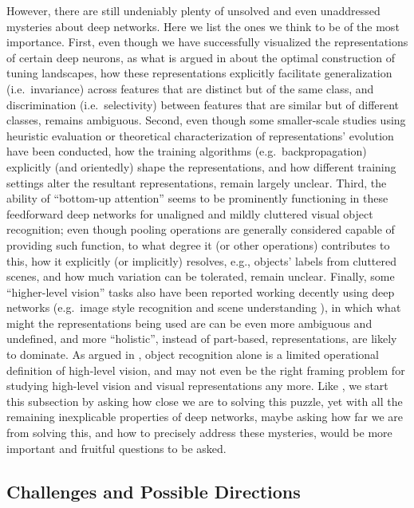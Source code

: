 However, there are still undeniably plenty of unsolved and even unaddressed mysteries about deep networks. Here we list the ones we think to be of the most importance. First, even though we have successfully visualized the representations of certain deep neurons, as what is argued in  about the optimal construction of tuning landscapes, how these representations explicitly facilitate generalization (i.e.~invariance) across features that are distinct but of the same class, and discrimination (i.e.~selectivity) between features that are similar but of different classes, remains ambiguous. Second, even though some smaller-scale studies using heuristic evaluation \cite{zeiler2014visualizing} or theoretical characterization \cite{saxe2013exact} of representations' evolution have been conducted, how the training algorithms (e.g.~backpropagation) explicitly (and orientedly) shape the representations, and how different training settings alter the resultant representations, remain largely unclear. Third, the ability of ``bottom-up attention'' seems to be prominently functioning in these feedforward deep networks \cite{zeiler2014visualizing, simonyan2013deep} for unaligned and mildly cluttered visual object recognition; even though pooling operations are generally considered capable of providing such function, to what degree it (or other operations) contributes to this, how it explicitly (or implicitly) resolves, e.g., objects' labels from cluttered scenes, and how much variation can be tolerated, remain unclear. Finally, some ``higher-level vision'' tasks also have been reported working decently using deep networks (e.g.~image style recognition \cite{karayev2013recognizing} and scene understanding \cite{CVPR14_Khosla}), in which what might the representations being used are can be even more ambiguous and undefined, and more ``holistic'', instead of part-based, representations, are likely to dominate. As argued in \cite{cox2014we}, object recognition alone is a limited operational definition of high-level vision, and may not even be the right framing problem for studying high-level vision and visual representations any more. Like \cite{olshausen2005close}, we start this subsection by asking how close we are to solving this puzzle, yet with all the remaining inexplicable properties of deep networks, maybe asking how far we are from solving this, and how to precisely address these mysteries, would be more important and fruitful questions to be asked.

\subsection*{Challenges and Possible Directions}

